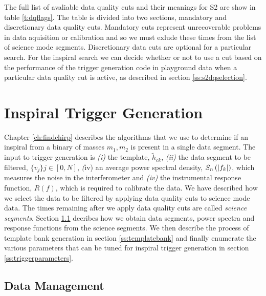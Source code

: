 The full list of avaliable data quality cuts and their meanings for S2 are
show in table \ref{t:dqflags}. The table is divided into two sections,
mandatory and discretionary data quality cuts. Mandatory cuts represent
unrecoverable problems in data aquisition or calibration and so we must exlude
these times from the list of science mode segments. Discretionary data cuts
are optional for a particular search. For the inspiral search we can decide
whether or not to use a cut based on the performance of the trigger generation
code in playground data when a particular data quality cut is active, as
described in section \ref{ss:s2dqselection}.

\section{Inspiral Trigger Generation}
\label{s:pipetemplate}

Chapter \ref{ch:findchirp} describes the algorithms that we use to determine
if an inspiral from a binary of masses ${m_1,m_2}$ is present in a single data
segment. The input to trigger generation is \emph{(i)} the template,
$\tilde{h}_{ck}$, \emph{(ii)} the data segment to be filtered, $\{v_j\} j \in
[0,N]$, \emph(iv) an average power spectral density, $S_n\left(\left|f_{k}\right|\right)$, which measures
the noise in the interferometer and \emph{(iv)} the instrumental response
function, $R(f)$, which is required to calibrate the data. We have described
how we select the data to be filtered by applying data quality cuts to science
mode data. The times remaining after we apply data quality cuts are called
\emph{science segments}. Section \ref{ss:datamanagement} decribes how we
obtain data segments, power spectra and response functions from the science
segments. We then describe the process of template bank generation in section
\ref{ss:templatebank} and finally enumerate the various parameters that can be
tuned for inspiral trigger generation in section \ref{ss:triggerparameters}.

\subsection{Data Management}
\label{ss:datamanagement}

